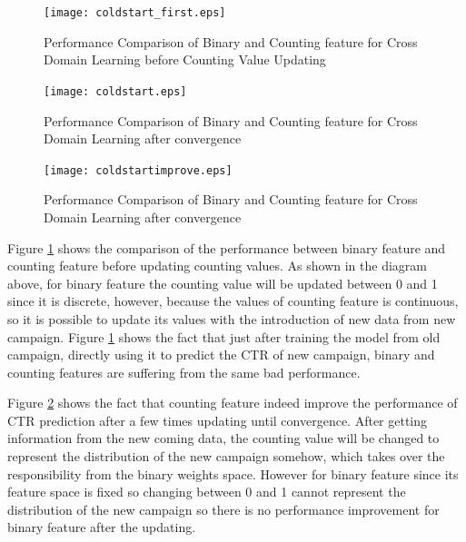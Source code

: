 \documentclass{sig-alternate}
\begin{document}
\begin{figure}[t]
\centering
\texttt{[image: coldstart\_first.eps]}
\caption{Performance Comparison of Binary and Counting feature for Cross Domain Learning before Counting Value Updating}
\label{fig:coldstart_first}
\end{figure}

\begin{figure}[t]
\centering
\texttt{[image: coldstart.eps]}
\caption{Performance Comparison of Binary and Counting feature for Cross Domain Learning after convergence}
\label{fig:coldstart}
\end{figure}

\begin{figure}[t]
\centering
\texttt{[image: coldstartimprove.eps]}
\caption{Performance Comparison of Binary and Counting feature for Cross Domain Learning after convergence}
\label{fig:coldstartimprove}
\end{figure}

Figure \ref{fig:coldstart_first} shows the comparison of the performance between binary feature and counting feature before updating counting values. As shown in the diagram above, for binary feature the counting value will be updated between 0 and 1 since it is discrete, however, because the values of counting feature is continuous, so it is possible to update its values with the introduction of new data from new campaign. Figure \ref{fig:coldstart_first} shows the fact that just after training the model from old campaign, directly using it to predict the CTR of new campaign, binary and counting features are suffering from the same bad performance. 

Figure \ref{fig:coldstart} shows the fact that counting feature indeed improve the performance of CTR prediction after a few times updating until convergence. After getting information from the new coming data, the counting value will be changed to represent the distribution of the new campaign somehow, which takes over the responsibility from the binary weights space. However for binary feature since its feature space is fixed so changing between 0 and 1 cannot represent the distribution of the new campaign so there is no performance improvement for binary feature after the updating. 
\end{document}
